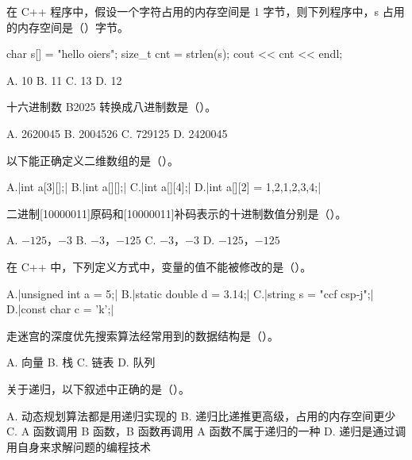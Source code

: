 \documentclass{cspexam}
\begin{document}


\Q 在 C++ 程序中，假设一个字符占用的内存空间是 1 字节，则下列程序中，s 占用的内存空间是（\quad）字节。
\begin{ncode}
char s[] = "hello oiers";
size_t cnt = strlen(s);
cout << cnt << endl;
\end{ncode}
\begin{optrow}
\op A. 10 \op B. 11 \op C. 13 \op D. 12
\end{optrow}

\Q 十六进制数 B2025 转换成八进制数是（\quad）。
\begin{optrow}
\op A. 2620045 \op B. 2004526 \op C. 729125 \op D. 2420045
\end{optrow}

\Q 以下能正确定义二维数组的是（\quad）。
\begin{optgrid}
\op A.\co|int a[3][];|
\op B.\co|int a[][];|
\op C.\co|int a[][4];|
\op D.\co|int a[][2] = {{1,2},{1,2},{3,4}};|
\end{optgrid}

\Q 二进制[10000011]原码和[10000011]补码表示的十进制数值分别是（\quad）。
\begin{optrow}
\op A. $-125$，$-3$ \op B. $-3$，$-125$ \op C. $-3$，$-3$ \op D. $-125$，$-125$
\end{optrow}

\Q 在 C++ 中，下列定义方式中，变量的值不能被修改的是（\quad）。
\begin{optgrid}
\op A.\co|unsigned int a = 5;|
\op B.\co|static double d = 3.14;|
\op C.\co|string s = "ccf csp-j";|
\op D.\co|const char c = 'k';|
\end{optgrid}

\Q 走迷宫的深度优先搜索算法经常用到的数据结构是（\quad）。
\begin{optrow}
\op A. 向量 \op B. 栈 \op C. 链表 \op D. 队列
\end{optrow}

\Q 关于递归，以下叙述中正确的是（\quad）。
\begin{optcol}
\op A. 动态规划算法都是用递归实现的
\op B. 递归比递推更高级，占用的内存空间更少
\op C. A 函数调用 B 函数，B 函数再调用 A 函数不属于递归的一种
\op D. 递归是通过调用自身来求解问题的编程技术
\end{optcol}
\end{document}
